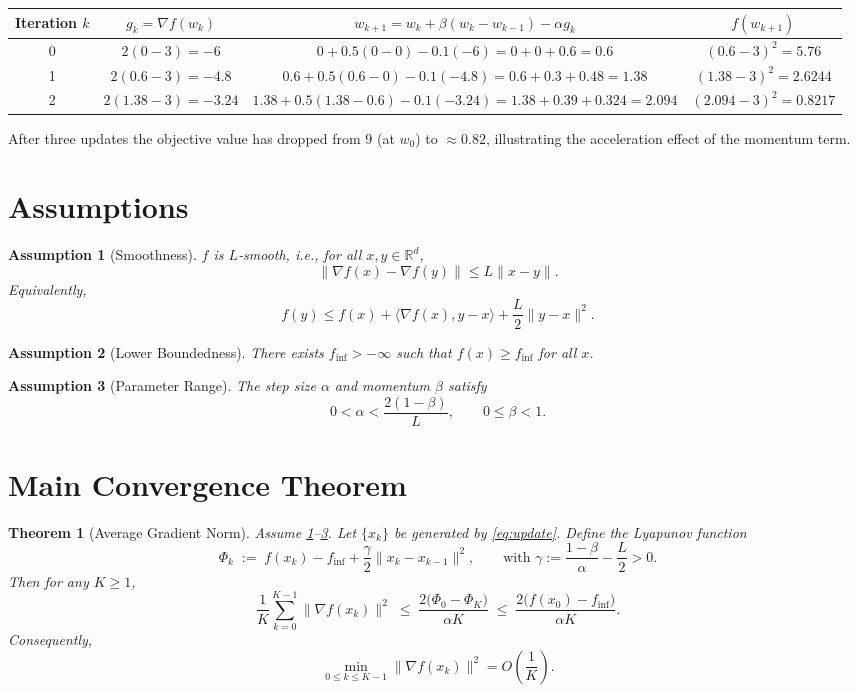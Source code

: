 \documentclass{article}
\newtheorem{theorem}{Theorem}
\newtheorem{assumption}{Assumption}
\newcommand{\grad}{\nabla}
\begin{document}
\begin{tabular}{c|c|c|c}
Iteration $k$ & $g_k=\grad f(w_k)$ & $w_{k+1}=w_k+\beta(w_k-w_{k-1})-\alpha g_k$ & $f(w_{k+1})$ \\ \hline
0 & $2(0-3)=-6$ & $0+0.5(0-0)-0.1(-6)=0+0+0.6=0.6$ & $(0.6-3)^2=5.76$ \\
1 & $2(0.6-3)=-4.8$ & $0.6+0.5(0.6-0)-0.1(-4.8)=0.6+0.3+0.48=1.38$ & $(1.38-3)^2=2.6244$ \\
2 & $2(1.38-3)=-3.24$ & $1.38+0.5(1.38-0.6)-0.1(-3.24)=1.38+0.39+0.324=2.094$ & $(2.094-3)^2=0.8217$
\end{tabular}

After three updates the objective value has dropped from $9$ (at $w_0$) to $\approx0.82$, illustrating the acceleration effect of the momentum term.

\newpage
\section*{Assumptions}
\begin{assumption}[Smoothness]\label{ass:smooth}
$f$ is $L$‑smooth, i.e., for all $x,y\in\mathbb{R}^d$,
\[
\|\grad f(x)-\grad f(y)\| \le L\|x-y\|.
\]
Equivalently,
\[
f(y) \le f(x) + \langle \grad f(x),y-x\rangle + \frac{L}{2}\|y-x\|^2.
\]
\end{assumption}
\begin{assumption}[Lower Boundedness]\label{ass:lb}
There exists $f_{\inf}>-\infty$ such that $f(x)\ge f_{\inf}$ for all $x$.
\end{assumption}
\begin{assumption}[Parameter Range]\label{ass:param}
The step size $\alpha$ and momentum $\beta$ satisfy
\[
0<\alpha<\frac{2(1-\beta)}{L},\qquad 0\le\beta<1.
\]
\end{assumption}

\section*{Main Convergence Theorem}
\begin{theorem}[Average Gradient Norm]\label{thm:main}
Assume \ref{ass:smooth}–\ref{ass:param}. Let $\{x_k\}$ be generated by \eqref{eq:update}. Define the Lyapunov function
\[
\Phi_k \;:=\; f(x_k) - f_{\inf} + \frac{\gamma}{2}\|x_k-x_{k-1}\|^2,
\qquad\text{with }\gamma:=\frac{1-\beta}{\alpha}-\frac{L}{2}>0.
\]
Then for any $K\ge 1$,
\[
\frac{1}{K}\sum_{k=0}^{K-1}\|\grad f(x_k)\|^2
\;\le\;
\frac{2\bigl(\Phi_0-\Phi_K\bigr)}{\alpha K}
\;\le\;
\frac{2\bigl(f(x_0)-f_{\inf}\bigr)}{\alpha K}.
\]
Consequently,
\[
\min_{0\le k\le K-1}\|\grad f(x_k)\|^2 = O\!\left(\frac{1}{K}\right).
\]
\end{theorem}
\end{document}
